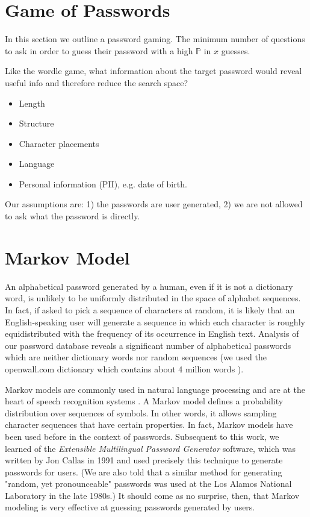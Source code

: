 \section{Game of Passwords}

In this section we outline a password gaming. The minimum number of questions to ask in order to guess their password with a high $\mathbb{P}$ in $x$ guesses.

Like the wordle game, what information about the target password would reveal useful info and therefore reduce the search space?

\begin{itemize}
    \item Length
    \item Structure
    \item Character placements
    \item Language
    \item Personal information (PII), e.g. date of birth.
\end{itemize}

Our assumptions are: 1) the passwords are user generated, 2) we are not allowed to ask what the password is directly.

\section{Markov Model}
An alphabetical password generated by a human, even if it is not a dictionary word, is unlikely to be uniformly distributed in the space of alphabet sequences. In fact, if asked to pick a sequence of characters at random, it is likely that an English-speaking user will generate a sequence in which each character is roughly equidistributed with the frequency of its occurrence in English text. Analysis of our password database reveals a significant number of alphabetical passwords which are neither dictionary words nor random sequences (we used the openwall.com dictionary which contains about 4 million words \cite{openwall}).

Markov models are commonly used in natural language processing and are at the heart of speech recognition systems \cite{jurafsky}. A Markov model defines a probability distribution over sequences of symbols. In other words, it allows sampling character sequences that have certain properties. In fact, Markov models have been used before in the context of passwords. Subsequent to this work, we learned of the \emph{Extensible Multilingual Password Generator} software, which was written by Jon Callas in 1991 and used precisely this technique to generate passwords for users. (We are also told that a similar method for generating "random, yet pronounceable" passwords was used at the Los Alamos National Laboratory in the late 1980s.) It should come as no surprise, then, that Markov modeling is very effective at guessing passwords generated by users.


